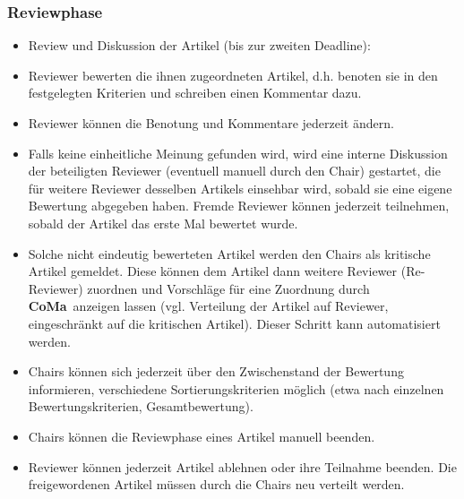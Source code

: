 \documentclass[headexclude,footexclude,12pt,BCOR0pt,DIV15]{scrartcl}
\newcommand{\CoMa}{\textbf{CoMa}}
\begin{document}
        \subsubsection{Reviewphase} \label{Reviewphase}
        \begin{itemize}
            \item Review und Diskussion der Artikel (bis zur zweiten Deadline):
            \item Reviewer bewerten die ihnen zugeordneten Artikel, d.h. benoten sie in den festgelegten Kriterien
                  und schreiben einen Kommentar dazu.
            \item Reviewer k\"{o}nnen die Benotung und Kommentare jederzeit \"{a}ndern.
            \item Falls keine einheitliche Meinung gefunden wird, wird eine interne Diskussion der beteiligten
                  Reviewer (eventuell manuell durch den Chair) gestartet, die f\"{u}r weitere Reviewer desselben
                  Artikels einsehbar wird, sobald sie eine eigene Bewertung abgegeben haben. Fremde Reviewer k\"{o}nnen
                  jederzeit teilnehmen, sobald der Artikel das erste Mal bewertet wurde.
            \item Solche nicht eindeutig bewerteten Artikel werden den Chairs als kritische Artikel gemeldet.
                  Diese k\"{o}nnen dem Artikel dann weitere Reviewer (Re-Reviewer) zuordnen und Vorschl\"{a}ge f\"{u}r
                  eine Zuordnung durch \CoMa\ anzeigen lassen (vgl. Verteilung der Artikel auf Reviewer, eingeschr\"{a}nkt
                  auf die kritischen Artikel). Dieser Schritt kann automatisiert werden.
            \item Chairs k\"{o}nnen sich jederzeit \"{u}ber den Zwischenstand der Bewertung informieren, verschiedene
                  Sortierungskriterien m\"{o}glich (etwa nach einzelnen Bewertungskriterien,
                  Gesamtbewertung).
            \item Chairs k\"{o}nnen die Reviewphase eines Artikel manuell beenden.
            \item Reviewer k\"{o}nnen jederzeit Artikel ablehnen oder ihre Teilnahme beenden. Die freigewordenen
                  Artikel m\"{u}ssen durch die Chairs neu verteilt werden.
        \end{itemize}

        \pagebreak
\end{document}

